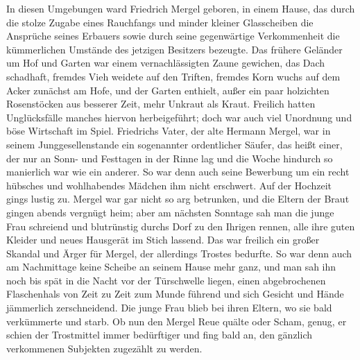 In diesen Umgebungen ward Friedrich Mergel geboren, in einem Hause, das durch die stolze Zugabe eines Rauchfangs und minder kleiner Glasscheiben die Ansprüche seines Erbauers sowie durch seine gegenwärtige Verkommenheit die kümmerlichen Umstände des jetzigen Besitzers bezeugte. Das frühere Geländer um Hof und Garten war einem vernachlässigten Zaune gewichen, das Dach schadhaft, fremdes Vieh weidete auf den Triften, fremdes Korn wuchs auf dem Acker zunächst am Hofe, und der Garten enthielt, außer ein paar holzichten Rosenstöcken aus besserer Zeit, mehr Unkraut als Kraut. Freilich hatten Unglücksfälle manches hiervon herbeigeführt; doch war auch viel Unordnung und böse Wirtschaft im Spiel. Friedrichs Vater, der alte Hermann Mergel, war in seinem Junggesellenstande ein sogenannter ordentlicher Säufer, das heißt einer, der nur an Sonn- und Festtagen in der Rinne lag und die Woche hindurch so manierlich war wie ein anderer. So war denn auch seine Bewerbung um ein recht hübsches und wohlhabendes Mädchen ihm nicht erschwert. Auf der Hochzeit gings lustig zu. Mergel war gar nicht so arg betrunken, und die Eltern der Braut gingen abends vergnügt heim; aber am nächsten Sonntage sah man die junge Frau schreiend und blutrünstig durchs Dorf zu den Ihrigen rennen, alle ihre guten Kleider und neues Hausgerät im Stich lassend. Das war freilich ein großer Skandal und Ärger für Mergel, der allerdings Trostes bedurfte. So war denn auch am Nachmittage keine Scheibe an seinem Hause mehr ganz, und man sah ihn noch bis spät in die Nacht vor der Türschwelle liegen, einen abgebrochenen Flaschenhals von Zeit zu Zeit zum Munde führend und sich Gesicht und Hände jämmerlich zerschneidend. Die junge Frau blieb bei ihren Eltern, wo sie bald verkümmerte und starb. Ob nun den Mergel Reue quälte oder Scham, genug, er schien der Trostmittel immer bedürftiger und fing bald an, den gänzlich verkommenen Subjekten zugezählt zu werden.

